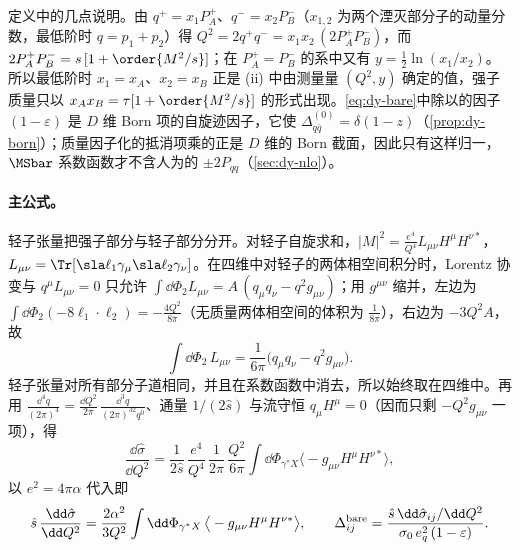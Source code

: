 定义中的几点说明。由 $q^+=x_1P_A^+$、$q^-=x_2P_B^-$（$x_{1,2}$ 为两个湮灭部分子的动量分数，最低阶时 $q=p_1+p_2$）得 $Q^2=2q^+q^-=x_1x_2\,(2P_A^+P_B^-)$，而 $2P_A^+P_B^-=s\,[1+\order{M^2/s}]$；在 $P_A^+=P_B^-$ 的系中又有 $y=\frac12\ln(x_1/x_2)$。所以最低阶时 $x_1=x_A$、$x_2=x_B$ 正是 (ii) 中由测量量 $(Q^2,y)$ 确定的值，强子质量只以 $x_Ax_B=\tau[1+\order{M^2/s}]$ 的形式出现。\cref{eq:dy-bare}中除以的因子 $(1-\varepsilon)$ 是 $D$ 维 Born 项的自旋迹因子，它使 $\Delta^{(0)}_{q\bar q}=\delta(1-z)$（\cref{prop:dy-born}）；质量因子化的抵消项乘的正是 $D$ 维的 Born 截面，因此只有这样归一，$\MSbar$ 系数函数才不含人为的 $\pm2P_{qq}$（\cref{sec:dy-nlo}）。

\paragraph{主公式。}轻子张量把强子部分与轻子部分分开。对轻子自旋求和，$|M|^2=\frac{e^4}{Q^4}L_{\mu\nu}H^\mu H^{\nu*}$，$L_{\mu\nu}=\Tr[\sla\ell_1\gamma_\mu\sla\ell_2\gamma_\nu]$。在四维中对轻子的两体相空间积分时，Lorentz 协变与 $q^\mu L_{\mu\nu}=0$ 只允许 $\int\dd\Phi_2L_{\mu\nu}=A\,(q_\mu q_\nu-q^2g_{\mu\nu})$；用 $g^{\mu\nu}$ 缩并，左边为 $\int\dd\Phi_2(-8\ell_1\cdot\ell_2)=-\frac{4Q^2}{8\pi}$（无质量两体相空间的体积为 $\frac1{8\pi}$），右边为 $-3Q^2A$，故
\begin{equation}\label{eq:dy-leptontensor}
\int\dd\Phi_2\,L_{\mu\nu}=\frac{1}{6\pi}\big(q_\mu q_\nu-q^2g_{\mu\nu}\big).
\end{equation}
轻子张量对所有部分子道相同，并且在系数函数中消去，所以始终取在四维中。再用 $\frac{\dd^4q}{(2\pi)^4}=\frac{\dd Q^2}{2\pi}\,\frac{\dd^3q}{(2\pi)^32q^0}$、通量 $1/(2\hat s)$ 与流守恒 $q_\mu H^\mu=0$（因而只剩 $-Q^2g_{\mu\nu}$ 一项），得
\[
\frac{\dd\hat\sigma}{\dd Q^2}=\frac{1}{2\hat s}\,\frac{e^4}{Q^4}\,\frac{1}{2\pi}\,\frac{Q^2}{6\pi}\int\dd\Phi_{\gamma^*X}\big\langle-g_{\mu\nu}H^\mu H^{\nu*}\big\rangle ,
\]
以 $e^2=4\pi\alpha$ 代入即
\begin{equation}\label{eq:dy-master}
\hat s\,\frac{\dd\hat\sigma}{\dd Q^2}=\frac{2\alpha^2}{3Q^2}\int\dd\Phi_{\gamma^*X}\,\big\langle-g_{\mu\nu}H^\mu H^{\nu*}\big\rangle ,\qquad
\Delta^{\rm bare}_{ij}=\frac{\hat s\,\dd\hat\sigma_{ij}/\dd Q^2}{\sigma_0\,e_q^2\,(1-\varepsilon)} .
\end{equation}

